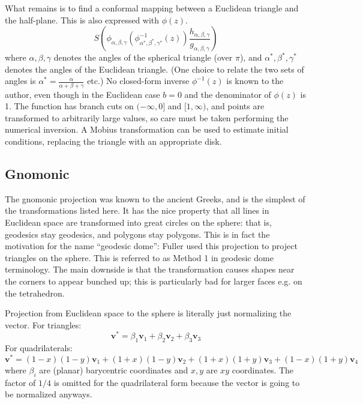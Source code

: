 \documentclass{amsart}[12pt]
\begin{document}
What remains is to find a conformal mapping between a Euclidean triangle and the
half-plane. This is also expressed with $\phi(z)$.
\begin{equation}
  S\left(\phi_{\alpha,\beta,\gamma}
  \left(\phi_{\alpha^*,\beta^*,\gamma^*}^{-1}(z)\right)
  \frac{h_{\alpha,\beta,\gamma}}{g_{\alpha,\beta,\gamma}}\right)
\end{equation}
where $\alpha,\beta,\gamma$ denotes the angles of the spherical triangle (over
$\pi$), and $\alpha^*,\beta^*,\gamma^*$ denotes the angles of the Euclidean
triangle. (One choice to relate the two sets of angles is $\alpha^* =
\frac{\alpha}{\alpha+\beta+\gamma}$ etc.)
No closed-form inverse $\phi^{-1}(z)$ is known to the author, even though in the
Euclidean case $b=0$ and the denominator of $\phi(z)$ is 1. The function has
branch cuts on $(-\infty,0]$ and $[1, \infty)$, and points are transformed to
arbitrarily large values, so care must be taken performing the numerical
inversion. A Mobius transformation can be used to estimate initial conditions,
replacing the triangle with an appropriate disk.

\subsection{Gnomonic}
The gnomonic projection was known to the ancient Greeks, and is the simplest
of the transformations listed here. It has the nice property that all lines in
Euclidean space are transformed into great circles on the sphere: that is,
geodesics stay geodesics, and polygons stay polygons. This is in fact the
motivation for the name ``geodesic dome'': Fuller used this projection to project
triangles on the sphere. This is referred to as Method 1 in geodesic dome
terminology. The main downside is that the transformation causes shapes
near the corners to appear bunched up;
this is particularly bad for larger faces e.g. on the tetrahedron.

Projection from Euclidean
space to the sphere is literally just normalizing the vector. For triangles:
\begin{equation}
   \mathbf v^* =
   \beta_1 \mathbf v_1 + \beta_2 \mathbf v_2 + \beta_3 \mathbf v_3
\end{equation}
For quadrilaterals:
\begin{equation}
   \mathbf v^* = (1-x)(1-y) \mathbf v_1 +
   (1+x)(1-y) \mathbf v_2 +
   (1+x)(1+y) \mathbf v_3 +
   (1-x)(1+y) \mathbf v_4
 \end{equation}
where $\beta_i$ are (planar) barycentric coordinates and $x,y$ are
$xy$ coordinates. The factor of $1/4$ is omitted for the quadrilateral
form because the vector is going to be normalized anyways.
\end{document}
